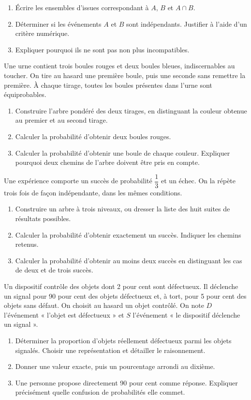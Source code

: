 \begin{enumerate}[label=\arabic*.]
\item Écrire les ensembles d’issues correspondant à $A$, $B$ et $A\cap B$.
\item Déterminer si les événements $A$ et $B$ sont indépendants. Justifier à l’aide d’un critère numérique.
\item Expliquer pourquoi ils ne sont pas non plus incompatibles.
\end{enumerate}
Une urne contient trois boules rouges et deux boules bleues, indiscernables au toucher. On tire au hasard une première boule, puis une seconde sans remettre la première. À chaque tirage, toutes les boules présentes dans l’urne sont équiprobables.
\begin{enumerate}[label=\arabic*.]
\item Construire l’arbre pondéré des deux tirages, en distinguant la couleur obtenue au premier et au second tirage.
\item Calculer la probabilité d’obtenir deux boules rouges.
\item Calculer la probabilité d’obtenir une boule de chaque couleur. Expliquer pourquoi deux chemins de l’arbre doivent être pris en compte.
\end{enumerate}
Une expérience comporte un succès de probabilité $\dfrac13$ et un échec. On la répète trois fois de façon indépendante, dans les mêmes conditions.
\begin{enumerate}[label=\arabic*.]
\item Construire un arbre à trois niveaux, ou dresser la liste des huit suites de résultats possibles.
\item Calculer la probabilité d’obtenir exactement un succès. Indiquer les chemins retenus.
\item Calculer la probabilité d’obtenir au moins deux succès en distinguant les cas de deux et de trois succès.
\end{enumerate}
Un dispositif contrôle des objets dont 2 pour cent sont défectueux. Il déclenche un signal pour 90 pour cent des objets défectueux et, à tort, pour 5 pour cent des objets sans défaut. On choisit au hasard un objet contrôlé. On note $D$ l’événement « l’objet est défectueux » et $S$ l’événement « le dispositif déclenche un signal ».
\begin{enumerate}[label=\arabic*.]
\item Déterminer la proportion d’objets réellement défectueux parmi les objets signalés. Choisir une représentation et détailler le raisonnement.
\item Donner une valeur exacte, puis un pourcentage arrondi au dixième.
\item Une personne propose directement 90 pour cent comme réponse. Expliquer précisément quelle confusion de probabilités elle commet.
\end{enumerate}
